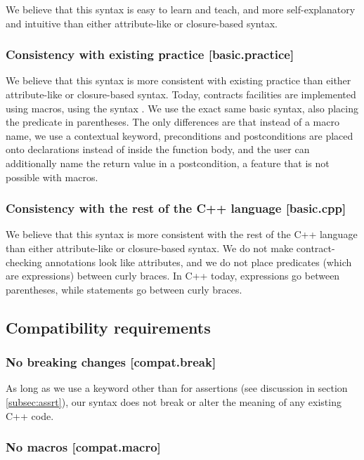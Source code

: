 We believe that this syntax is easy to learn and teach, and more self-explanatory and intuitive than either attribute-like or closure-based syntax.

\subsubsection{Consistency with existing practice  [basic.practice]}

We believe that this syntax is more consistent with existing practice than either attribute-like or closure-based syntax. Today, contracts facilities are implemented using macros, using the syntax . We use the exact same basic syntax, also placing the predicate in parentheses. The only differences are that instead of a macro name, we use a contextual keyword, preconditions and postconditions are placed onto declarations instead of inside the function body, and the user can additionally name the return value in a postcondition, a feature that is not possible with macros.

\subsubsection{Consistency with the rest of the C++ language  [basic.cpp]}

We believe that this syntax is more consistent with the rest of the C++ language than either attribute-like or closure-based syntax. We do not make contract-checking annotations look like attributes, and we do not place predicates (which are expressions) between curly braces. In C++ today, expressions go between parentheses, while statements go between curly braces.

\subsection{Compatibility requirements}

\subsubsection{No breaking changes  [compat.break]}

As long as we use a keyword other than  for assertions (see discussion in section \ref{subsec:assrt}), our syntax does not break or alter the meaning of any existing C++ code.

\subsubsection{No macros  [compat.macro]}

